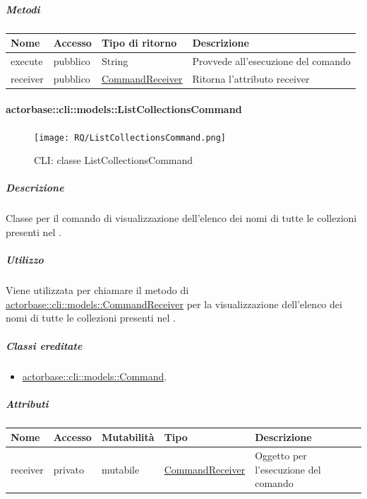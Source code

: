 \documentclass{scalatekids-article}
\begin{document}
\subparagraph{Metodi}

\begin{tabular}{| p{3cm} | p{1.5cm} | p{3.5cm} | p{9cm} |}
  \hline
  Nome & Accesso & Tipo di ritorno & Descrizione\\
  \hline
  execute & pubblico & String & Provvede all'esecuzione del comando\\
  \hline
  receiver & pubblico & \hyperref[sec:actorbase::cli::models::CommandReceiver]{CommandReceiver} & Ritorna l'attributo receiver\\
  \hline
\end{tabular}

\paragraph{actorbase::cli::models::ListCollectionsCommand}
\label{sec:actorbase::cli::models::ListCollectionsCommand}

\begin{figure}[H]
  \begin{center}
    \texttt{[image: RQ/ListCollectionsCommand.png]}
    \caption{CLI: classe ListCollectionsCommand}
  \end{center}
\end{figure}

\subparagraph{Descrizione}

Classe per il comando di visualizzazione dell'elenco dei nomi di tutte le
collezioni presenti nel .

\subparagraph{Utilizzo}

Viene utilizzata per chiamare il metodo di
\hyperref[sec:actorbase::cli::models::CommandReceiver]{actorbase::cli::models::CommandReceiver} per la visualizzazione dell'elenco dei
nomi di tutte le collezioni presenti nel .

\subparagraph{Classi ereditate}

\begin{itemize}
\item \hyperref[sec:actorbase::cli::models::Command]{actorbase::cli::models::Command}.
\end{itemize}

\subparagraph{Attributi}

\begin{tabular}{| p{1cm} | p{1.5cm} | p{2cm} | p{4cm} | p{8.5cm} |}
  \hline
  Nome & Accesso & Mutabilità & Tipo & Descrizione\\
  \hline
  receiver & privato & mutabile & \hyperref[sec:actorbase::cli::models::CommandReceiver]{CommandReceiver} & Oggetto per l'esecuzione del comando\\
  \hline
\end{tabular}
\end{document}
